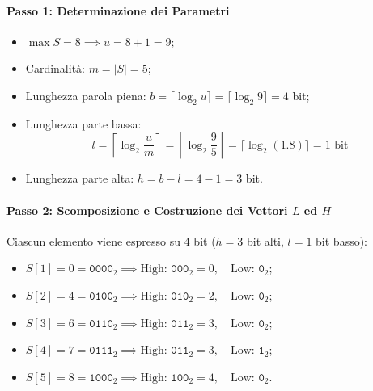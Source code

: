 \paragraph{Passo 1: Determinazione dei Parametri}
\begin{itemize}
  \item $\max S = 8 \implies u = 8 + 1 = 9$;
  \item Cardinalit\`a: $m = |S| = 5$;
  \item Lunghezza parola piena: $b = \lceil \log_2 u \rceil = \lceil \log_2 9 \rceil = 4$ bit;
  \item Lunghezza parte bassa:
  \begin{equation*}
    l = \left\lceil \log_2 \frac{u}{m} \right\rceil = \left\lceil \log_2 \frac{9}{5} \right\rceil = \lceil \log_2(1.8) \rceil = 1 \text{ bit}
  \end{equation*}
  \item Lunghezza parte alta: $h = b - l = 4 - 1 = 3$ bit.
\end{itemize}

\paragraph{Passo 2: Scomposizione e Costruzione dei Vettori $L$ ed $H$}
Ciascun elemento viene espresso su 4 bit ($h = 3$ bit alti, $l = 1$ bit basso):
\begin{itemize}
  \item $S[1] = 0 = \texttt{0000}_2 \implies \text{High: } \texttt{000}_2 = 0, \quad \text{Low: } \texttt{0}_2$;
  \item $S[2] = 4 = \texttt{0100}_2 \implies \text{High: } \texttt{010}_2 = 2, \quad \text{Low: } \texttt{0}_2$;
  \item $S[3] = 6 = \texttt{0110}_2 \implies \text{High: } \texttt{011}_2 = 3, \quad \text{Low: } \texttt{0}_2$;
  \item $S[4] = 7 = \texttt{0111}_2 \implies \text{High: } \texttt{011}_2 = 3, \quad \text{Low: } \texttt{1}_2$;
  \item $S[5] = 8 = \texttt{1000}_2 \implies \text{High: } \texttt{100}_2 = 4, \quad \text{Low: } \texttt{0}_2$.
\end{itemize}

